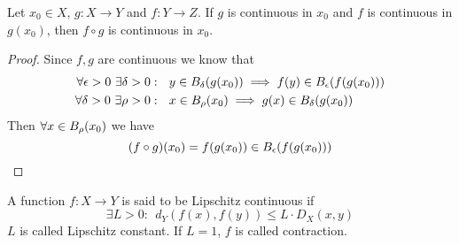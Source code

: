 \documentclass[../../script.tex]{subfiles}
\begin{document}
\begin{thm}
    Let $x_0 \in X$, $g: X \rightarrow Y$ and $f: Y \rightarrow Z$. If $g$ is continuous in $x_0$ and $f$ is continuous in $g(x_0)$,
    then $f \circ g$ is continuous in $x_0$.

    \begin{center}
    \end{center}
\end{thm}
\begin{proof}
    Since $f, g$ are continuous we know that
    \begin{subequations}
        \begin{align}
            \forall \epsilon > 0 ~\exists \delta > 0&: ~~y \in \oball[\delta](g(x_0)) \implies f(y) \in \oball(f(g(x_0))) \\
            \forall \delta > 0 ~\exists \rho > 0&: ~~x \in \oball[\rho](x_0) \implies g(x) \in \oball[\delta](g(x_0))
        \end{align}
    \end{subequations}
    Then $\forall x \in \oball[\rho](x_0)$ we have 
    \begin{equation}
        (f \circ g)(x_0) = f(g(x_0)) \in \oball(f(g(x_0))) 
    \end{equation}
\end{proof}

\begin{defi}
    A function $f: X \rightarrow Y$ is said to be Lipschitz continuous if
    \[
        \exists L > 0: ~~d_Y(f(x), f(y)) \le L \cdot D_X(x, y)
    \]
    $L$ is called Lipschitz constant. If $L = 1$, $f$ is called contraction.
\end{defi}
\end{document}
